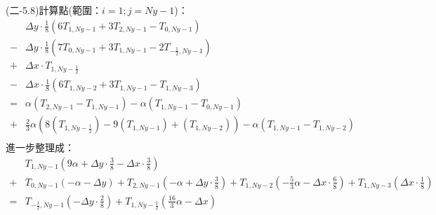 \documentclass[12pt]{article}
\begin{document}
\noindent (二-5.8)計算點(範圍：$i = 1 ; j = Ny-1$)：\\
\begin{equation}
\begin{split}
  &\Delta y \cdot \frac{1}{8}\left(6T_{1,Ny-1}+3T_{2,Ny-1}-T_{0,Ny-1}\right)  \\
  - &\Delta y \cdot \frac{1}{8}\left(7T_{0,Ny-1}+3T_{1,Ny-1}-2T_{-\frac{1}{2},Ny-1}\right) \\
  + &\Delta x \cdot T_{1,Ny-\frac{1}{2}} \\
  - &\Delta x \cdot \frac{1}{8}\left(6T_{1,Ny-2}+3T_{1,Ny-1}-T_{1,Ny-3}\right) \\
  = & \alpha(T_{2,Ny-1}-T_{1,Ny-1}) -  \alpha (T_{1,Ny-1}-T_{0,Ny-1})\\
  + & \frac{2}{3} \alpha (8(T_{1,Ny-\frac{1}{2}})-9(T_{1,Ny-1})+(T_{1,Ny-2})) -  \alpha (T_{1,Ny-1}-T_{1,Ny-2}) \\
\end{split}
\end{equation}
\noindent 進一步整理成：
\begin{equation}
\begin{split}
  &T_{1,Ny-1}(9\alpha+\Delta y \cdot \frac{3}{8}-\Delta x \cdot \frac{3}{8})\\
  +&T_{0,Ny-1}(-\alpha-\Delta y)+T_{2,Ny-1}(-\alpha+\Delta y \cdot \frac{3}{8} )+T_{1,Ny-2}(-\frac{5}{3}\alpha- \Delta x \cdot \frac{6}{8})+T_{1,Ny-3}(\Delta x \cdot \frac{1}{8})\\
  =&T_{-\frac{1}{2},Ny-1}(-\Delta y \cdot \frac{2}{8})+T_{1,Ny-\frac{1}{2}}(\frac{16}{3} \alpha-\Delta x)\\
  \end{split}
\end{equation}
\end{document}
